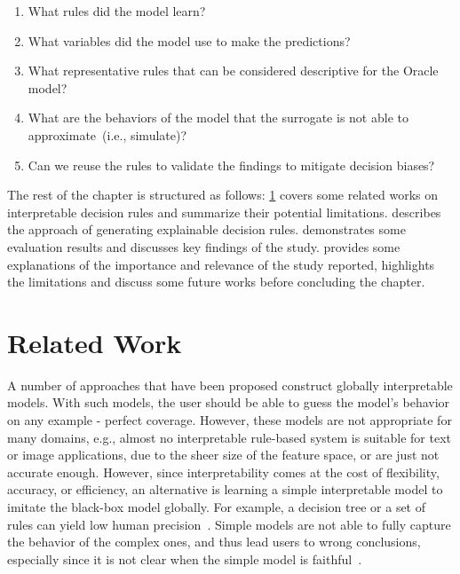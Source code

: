 \begin{enumerate}[noitemsep]
    \item What rules did the model learn?
    \item What variables did the model use to make the predictions?
    \item What representative rules that can be considered descriptive for the Oracle model?
    \item What are the behaviors of the model that the surrogate is not able to approximate~(i.e., simulate)?
    \item Can we reuse the rules to validate the findings to mitigate decision biases? 
\end{enumerate}

\hspace*{3.5mm} The rest of the chapter is structured as follows: \cref{chapter_7:rw} covers some related works on interpretable decision rules and summarize their potential limitations.  describes the approach of generating explainable decision rules.  demonstrates some evaluation results and discusses key findings of the study.  provides some explanations of the importance and relevance of the study reported, highlights the limitations and discuss some future works before concluding the chapter.  

\section{Related Work} \label{chapter_7:rw}
A number of approaches that have been proposed construct globally interpretable models. With such models, the user should be able to guess the model’s behavior on any example - perfect coverage. However, these models are not appropriate for many domains, e.g., almost no interpretable rule-based system is suitable for text or image applications, due to the sheer size of the feature space, or are just not accurate enough. However, since interpretability comes at the cost of flexibility, accuracy, or efficiency, an alternative is learning a simple interpretable model to imitate the black-box model globally. For example, a decision tree or a set of rules can yield low human precision~\cite{molnar2019interpretable}. Simple models are not able to fully capture the behavior of the complex ones, and thus lead users to wrong conclusions, especially since it is not clear when the simple model is faithful~\cite{bhatt2020explainable}. 

